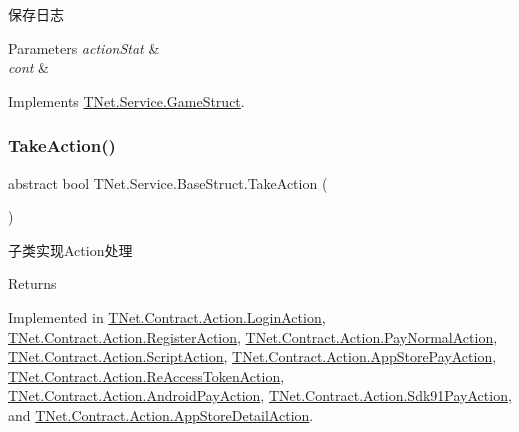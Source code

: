 保存日志 


\begin{DoxyParams}{Parameters}
{\em action\+Stat} & \\
\hline
{\em cont} & \\
\hline
\end{DoxyParams}


Implements \mbox{\hyperlink{class_t_net_1_1_service_1_1_game_struct_aff61ff71c1dd0a5ffef06af3f80f79ca}{T\+Net.\+Service.\+Game\+Struct}}.

\mbox{\label{class_t_net_1_1_service_1_1_base_struct_a5a1250b74d925d42066aebdefa36f54a}} 
\subsubsection{\texorpdfstring{Take\+Action()}{TakeAction()}}
{\footnotesize\ttfamily abstract bool T\+Net.\+Service.\+Base\+Struct.\+Take\+Action (\begin{DoxyParamCaption}{ }\end{DoxyParamCaption})\hspace{0.3cm}{\ttfamily [pure virtual]}}



子类实现\+Action处理 

\begin{DoxyReturn}{Returns}

\end{DoxyReturn}


Implemented in \mbox{\hyperlink{class_t_net_1_1_contract_1_1_action_1_1_login_action_a6ebe6efbb40f61f586ac86f9a3428edf}{T\+Net.\+Contract.\+Action.\+Login\+Action}}, \mbox{\hyperlink{class_t_net_1_1_contract_1_1_action_1_1_register_action_ad8844eaa6365b2b6b200634a1e860e1e}{T\+Net.\+Contract.\+Action.\+Register\+Action}}, \mbox{\hyperlink{class_t_net_1_1_contract_1_1_action_1_1_pay_normal_action_aa8648c2a4c6bef0a27d694dcd953e516}{T\+Net.\+Contract.\+Action.\+Pay\+Normal\+Action}}, \mbox{\hyperlink{class_t_net_1_1_contract_1_1_action_1_1_script_action_a93573bb7b31b15eccb5268ac64e2c41b}{T\+Net.\+Contract.\+Action.\+Script\+Action}}, \mbox{\hyperlink{class_t_net_1_1_contract_1_1_action_1_1_app_store_pay_action_a23f443cab7cfe7507638e2bc32030e49}{T\+Net.\+Contract.\+Action.\+App\+Store\+Pay\+Action}}, \mbox{\hyperlink{class_t_net_1_1_contract_1_1_action_1_1_re_access_token_action_a43205d0d7be766ffd79fef9d8b6730d5}{T\+Net.\+Contract.\+Action.\+Re\+Access\+Token\+Action}}, \mbox{\hyperlink{class_t_net_1_1_contract_1_1_action_1_1_android_pay_action_aaadcdc3f7633432ae0a8925e4a287617}{T\+Net.\+Contract.\+Action.\+Android\+Pay\+Action}}, \mbox{\hyperlink{class_t_net_1_1_contract_1_1_action_1_1_sdk91_pay_action_a430e62dca404f98f769d4eef297c19e8}{T\+Net.\+Contract.\+Action.\+Sdk91\+Pay\+Action}}, and \mbox{\hyperlink{class_t_net_1_1_contract_1_1_action_1_1_app_store_detail_action_a16a7cfa158cd14c46c4c665c49c7ded4}{T\+Net.\+Contract.\+Action.\+App\+Store\+Detail\+Action}}.

